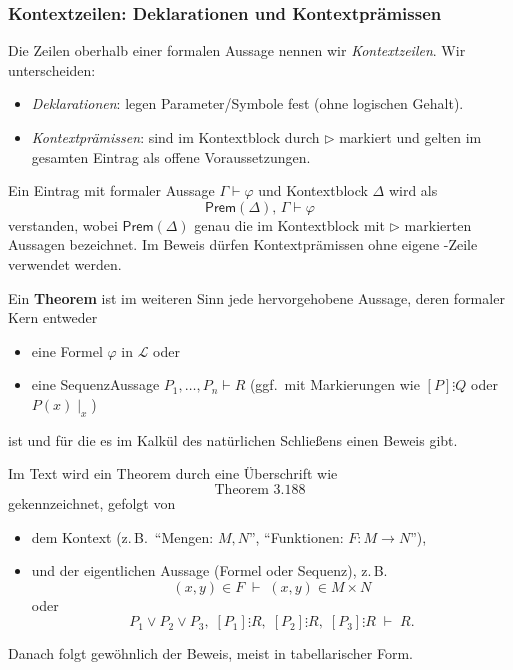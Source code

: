 \documentclass[main.tex]{subfiles}
\begin{document}
\subsubsection{Kontextzeilen: Deklarationen und Kontextprämissen}

\begin{remark}
Die Zeilen oberhalb einer formalen Aussage nennen wir \emph{Kontextzeilen}.
Wir unterscheiden:
\begin{itemize}
\item \emph{Deklarationen}: legen Parameter/Symbole fest (ohne logischen Gehalt).
\item \emph{Kontextprämissen}: sind im Kontextblock durch \(\triangleright\) markiert und
gelten im gesamten Eintrag als offene Voraussetzungen.
\end{itemize}
Ein Eintrag mit formaler Aussage \(\Gamma \vdash \varphi\) und Kontextblock \(\Delta\)
wird als
\[
  \mathsf{Prem}(\Delta),\,\Gamma \vdash \varphi
\]
verstanden, wobei \(\mathsf{Prem}(\Delta)\) genau die im Kontextblock mit
\(\triangleright\) markierten Aussagen bezeichnet.
Im Beweis dürfen Kontextprämissen ohne eigene \rA-Zeile verwendet werden.
\end{remark}




\begin{definition}[Theorem]
Ein \textbf{Theorem} ist im weiteren Sinn jede hervorgehobene
Aussage, deren formaler Kern entweder
\begin{itemize}
  \item eine Formel \(\varphi\) in \(\mathcal L\) oder
  \item eine Sequenz\-Aussage \(P_1,\dots,P_n \vdash R\) (ggf.\ mit
        Markierungen wie \([P]\vdots Q\) oder \(P(x)\mid_x\))
\end{itemize}
ist und für die es im Kalkül des natürlichen Schließens einen
Beweis gibt.

Im Text wird ein Theorem durch eine Überschrift wie
\[
  \text{Theorem 3.188}
\]
gekennzeichnet, gefolgt von
\begin{itemize}
  \item dem Kontext (z.\,B.\ \enquote{Mengen:
        \(M,N\)}, \enquote{Funktionen: \(F\colon M\to N\)}),
  \item und der eigentlichen Aussage (Formel oder Sequenz), z.\,B.
        \[
          (x,y)\in F \;\vdash\; (x,y)\in M\times N
        \]
        oder
        \[
          P_1\lor P_2\lor P_3,\; [P_1]\vdots R,\; [P_2]\vdots R,\;
          [P_3]\vdots R \;\vdash\; R.
        \]
\end{itemize}
Danach folgt gewöhnlich der Beweis, meist in tabellarischer Form.
\end{definition}
\end{document}
